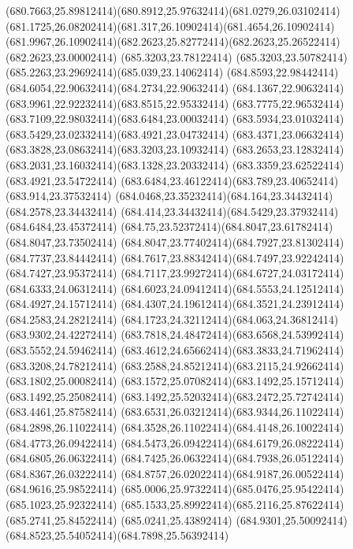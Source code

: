{{	\curveto(680.7663,25.89812414)(680.8912,25.97632414)(681.0279,26.03102414)
	\curveto(681.1725,26.08202414)(681.317,26.10902414)(681.4654,26.10902414)
	\curveto(681.9967,26.10902414)(682.2623,25.82772414)(682.2623,25.26522414)
	\lineto(682.2623,23.00002414)
	\closepath
	\moveto(685.3203,23.78122414)
	\curveto(685.3203,23.50782414)(685.2263,23.29692414)(685.039,23.14062414)
	\curveto(684.8593,22.98442414)(684.6054,22.90632414)(684.2734,22.90632414)
	\curveto(684.1367,22.90632414)(683.9961,22.92232414)(683.8515,22.95332414)
	\curveto(683.7775,22.96532414)(683.7109,22.98032414)(683.6484,23.00032414)
	\curveto(683.5934,23.01032414)(683.5429,23.02332414)(683.4921,23.04732414)
	\curveto(683.4371,23.06632414)(683.3828,23.08632414)(683.3203,23.10932414)
	\curveto(683.2653,23.12832414)(683.2031,23.16032414)(683.1328,23.20332414)
	\lineto(683.3359,23.62522414)
	\lineto(683.4921,23.54722414)
	\curveto(683.6484,23.46122414)(683.789,23.40652414)(683.914,23.37532414)
	\curveto(684.0468,23.35232414)(684.164,23.34432414)(684.2578,23.34432414)
	\curveto(684.414,23.34432414)(684.5429,23.37932414)(684.6484,23.45372414)
	\curveto(684.75,23.52372414)(684.8047,23.61782414)(684.8047,23.73502414)
	\curveto(684.8047,23.77402414)(684.7927,23.81302414)(684.7737,23.84442414)
	\curveto(684.7617,23.88342414)(684.7497,23.92242414)(684.7427,23.95372414)
	\curveto(684.7117,23.99272414)(684.6727,24.03172414)(684.6333,24.06312414)
	\curveto(684.6023,24.09412414)(684.5553,24.12512414)(684.4927,24.15712414)
	\curveto(684.4307,24.19612414)(684.3521,24.23912414)(684.2583,24.28212414)
	\curveto(684.1723,24.32112414)(684.063,24.36812414)(683.9302,24.42272414)
	\curveto(683.7818,24.48472414)(683.6568,24.53992414)(683.5552,24.59462414)
	\curveto(683.4612,24.65662414)(683.3833,24.71962414)(683.3208,24.78212414)
	\curveto(683.2588,24.85212414)(683.2115,24.92662414)(683.1802,25.00082414)
	\curveto(683.1572,25.07082414)(683.1492,25.15712414)(683.1492,25.25082414)
	\curveto(683.1492,25.52032414)(683.2472,25.72742414)(683.4461,25.87582414)
	\curveto(683.6531,26.03212414)(683.9344,26.11022414)(684.2898,26.11022414)
	\curveto(684.3528,26.11022414)(684.4148,26.10022414)(684.4773,26.09422414)
	\curveto(684.5473,26.09422414)(684.6179,26.08222414)(684.6805,26.06322414)
	\curveto(684.7425,26.06322414)(684.7938,26.05122414)(684.8367,26.03222414)
	\curveto(684.8757,26.02022414)(684.9187,26.00522414)(684.9616,25.98522414)
	\curveto(685.0006,25.97322414)(685.0476,25.95422414)(685.1023,25.92322414)
	\curveto(685.1533,25.89922414)(685.2116,25.87622414)(685.2741,25.84522414)
	\lineto(685.0241,25.43892414)
	\curveto(684.9301,25.50092414)(684.8523,25.54052414)(684.7898,25.56392414)
}}
